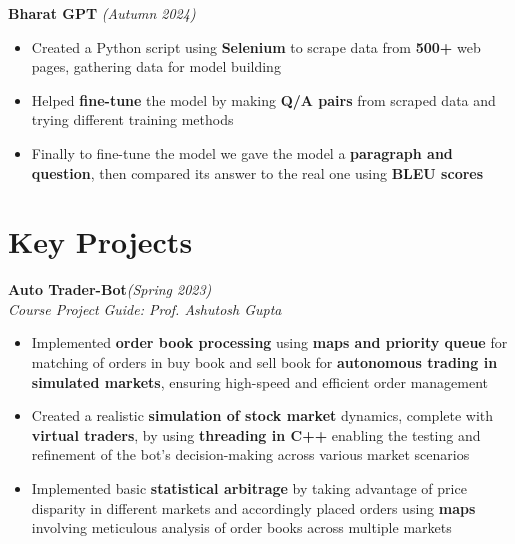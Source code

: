 \documentclass[11pt,letterpaper,sans]{moderncv}
\begin{document}
\noindent \textbf{\large Bharat GPT} \hfill{\sl \small (Autumn 2024)}\\

\vspace{-14pt}
\begin{itemize}[noitemsep, topsep=0pt, leftmargin=*]
\setlength\itemsep{\subpointspacing}
\item Created a Python script using \textbf{Selenium} to scrape data from \textbf{500+} web pages, gathering data for model building
\item Helped \textbf{fine-tune} the model by making\textbf{ Q/A pairs} from scraped data and trying different training methods
\item Finally to fine-tune the model we gave the model a \textbf{paragraph and question}, then compared its answer to the real one using \textbf{BLEU scores}
\end{itemize}

\vspace{-10pt}

\section{\LARGE Key Projects}
\vspace{-4pt}

\newcommand{\projectspacing}{8pt}
\newcommand{\spacinghue}{14pt}
\newcommand{\subpointspacing}{2pt}

\noindent \textbf{\large Auto Trader-Bot}\hfill{\sl \small (Spring 2023)}\\
{\it Course Project \textbar} {\it Guide: Prof. Ashutosh Gupta}\\
\vspace{-\spacinghue}
\begin{itemize}[noitemsep, topsep=0pt, leftmargin=*]
\setlength\itemsep{\subpointspacing}

    \item Implemented \textbf{order book processing} using \textbf{maps and priority queue} for matching of orders in buy book and sell book for \textbf{autonomous trading in simulated markets}, ensuring high-speed and efficient order management
    \item Created a realistic \textbf{simulation of stock market} dynamics, complete with \textbf{virtual traders}, by using \textbf{threading in C++} enabling the testing and refinement of the bot's decision-making across various market scenarios
    
    \item Implemented basic \textbf{statistical arbitrage} by taking advantage of price disparity in different markets and accordingly placed orders using \textbf{maps} involving meticulous analysis of order books across multiple markets
\end{itemize}
\end{document}
